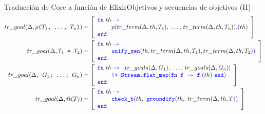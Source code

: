 \documentclass[14pt,aspectratio=169]{beamer}
\begin{document}
\begin{frame}{Traducción de Core a función de Elixir}{Objetivos y secuencias de objetivos (II)}
  \scriptsize \begin{align*}
    tr\_goal(\Delta, p\texttt{($T_1$, \ldots, $T_n$)}) & = \left[
      \begin{array}{lrl}
        \textcolor{blue}{\texttt{fn}}\ th\ \textcolor{blue}{\rightarrow}\ \\
        \ \ \ \ \ \ \ p\textcolor{blue}{(}tr\_term(\Delta, th, T_1)\textcolor{blue}{,}\ \ldots\textcolor{blue}{,}\ tr\_term(\Delta, th, T_n)\textcolor{blue}{)}.\textcolor{blue}{(}th\textcolor{blue}{)}\\
        \textcolor{blue}{\texttt{end}}
      \end{array}
    \right]\\
    tr\_goal(\Delta, \texttt{$T_1$ = $T_2$}) & = \left[
      \begin{array}{lrl}
        \textcolor{blue}{\texttt{fn}}\ th\ \textcolor{blue}{\rightarrow}\\
        \ \ \ \ \ \ \ \textcolor{blue}{\texttt{unify\_gen}(}th, tr\_term(\Delta, th, T_1), tr\_term(\Delta, th, T_2)\textcolor{blue}{)} \\
        \textcolor{blue}{\texttt{end}}
      \end{array}
    \right]\\
    tr\_goal(\Delta, \texttt{\ $G_1$; \ldots ; $G_n$}) & = \left[
      \begin{array}{lrl}
        \textcolor{blue}{\texttt{fn}}\ th\ \textcolor{blue}{\rightarrow\ [}tr\_goals(\Delta, G_1)\textcolor{blue}{,}\ \ldots\textcolor{blue}{,}\ tr\_goals(\Delta, G_n)\textcolor{blue}{]}\\
        \ \ \ \ \ \ \ \textcolor{blue}{\texttt{|>\ Stream.flat\_map}(\texttt{fn\ f}\ \rightarrow\ \texttt{f}.(}th\textcolor{blue}{)\ \texttt{end})}\ \\
        \textcolor{blue}{\texttt{end}}
      \end{array}
    \right]\\
    tr\_goal(\Delta, @(T)) & = \left[
      \begin{array}{lrl}
        \textcolor{blue}{\texttt{fn}}\ th\ \textcolor{blue}{\rightarrow} \\
        \ \ \ \ \ \ \ \textcolor{blue}{\texttt{check\_b}(}th,\ \textcolor{blue}{\texttt{groundify}(}th,\ tr\_term(\Delta, th, T\textcolor{blue}{))} \\
        \textcolor{blue}{\texttt{end}}
      \end{array}
      \right]
  \end{align*}
\end{frame}
\end{document}
